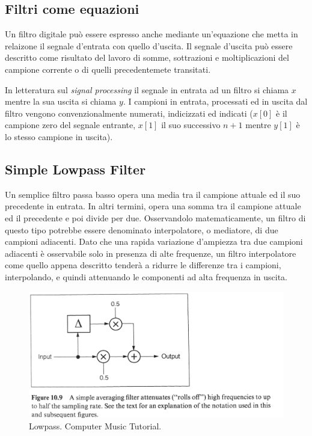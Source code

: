 \subsection{Filtri come equazioni}

Un filtro digitale può essere espresso anche mediante un'equazione che metta in
relaizone il segnale d'entrata con quello d'uscita. Il segnale d'uscita può essere
descritto come risultato del lavoro di somme, sottrazioni e moltiplicazioni del
campione corrente o di quelli precedentemete transitati.

In letteratura sul \emph{signal processing} il segnale in entrata ad un filtro si
chiama $ x $ mentre la sua uscita si chiama $ y $. I campioni in entrata, processati
ed in uscita dal filtro vengono convenzionalmente numerati, indicizzati ed indicati
($ x[0] $ è il campione zero del segnale entrante, $ x[1] $ il suo successivo
$ n+1 $ mentre $ y[1] $ è lo stesso campione in uscita).

\subsection{Simple Lowpass Filter}

Un semplice filtro passa basso opera una media tra il campione attuale ed il suo
precedente in entrata. In altri termini, opera una somma tra il campione attuale
ed il precedente e poi divide per due. Osservandolo matematicamente, un filtro di
questo tipo potrebbe essere denominato interpolatore, o mediatore, di due
campioni adiacenti. Dato che una rapida variazione d'ampiezza tra due campioni
adiacenti è osservabile solo in presenza di alte frequenze, un filtro interpolatore
come quello appena descritto tenderà a ridurre le differenze tra i campioni,
interpolando, e quindi attenuando le componenti ad alta frequenza in uscita.

\begin{figure}[ht]
  \centering
  \includegraphics[width=\textwidth]{CAPITOLI/0500/IMG/CT_Lowpass.pdf}
  \caption[]{Lowpass. Computer Music Tutorial.}
  \label{CT-Lowpass}
\end{figure}

